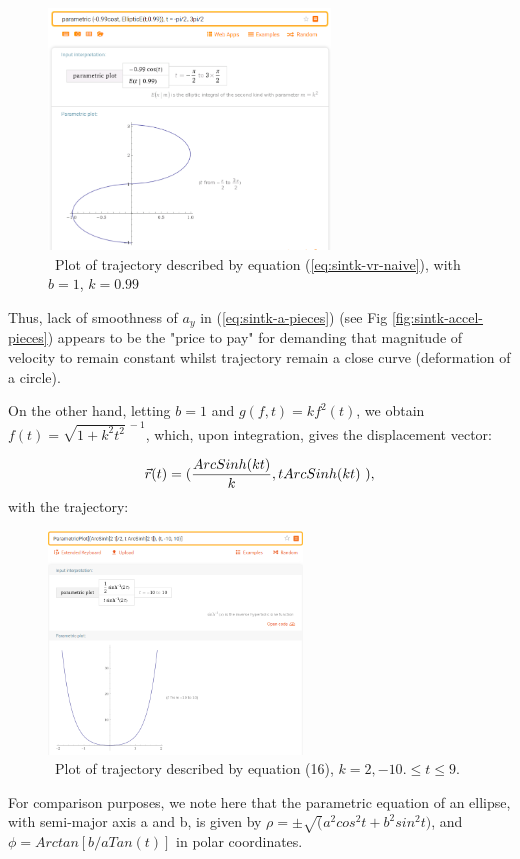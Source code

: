 \documentclass[journal]{IEEEtran}
\begin{document}
\begin{figure}[H]
\includegraphics[width=7.5cm]{traject-sintk-naive}
\caption{\ Plot of trajectory described by equation (\ref{eq:sintk-vr-naive}), with $b=1$, $k=0.99$ \bigskip}
\centering
\label{fig:traject-sintk-naive}
\end{figure}


Thus, lack of smoothness of $a_y$ in (\ref{eq:sintk-a-pieces}) (see Fig \ref{fig:sintk-accel-pieces}) appears to be the "price to pay" for demanding that magnitude of velocity to remain constant whilst trajectory remain a close curve (deformation of a circle).

On the other hand, letting $b=1$ and $g(f,t)=kf^2(t)$, we obtain $ f(t) = \sqrt{1+{k^2}{t^2}}^{\ -1}$, which, upon integration, gives the displacement vector:

\begin{align}
\vec{r}(t)=({ArcSinh(kt)\over k}, {tArcSinh(kt)} \ ),
\end{align} with the trajectory:

\begin{figure}[H]
\includegraphics[width=6.75cm]{fig11}
\caption{\ Plot of trajectory described by equation (16), $k=2, -10. \leq t \leq 9. $\bigskip}
\centering
\end{figure}

For comparison purposes, we note here that the parametric equation of an ellipse, with semi-major axis a and b, is given by 
$\rho = \pm \sqrt(a^2cos^2t+ b^2sin^2t) $, and 
$\phi = Arctan[b/aTan(t)]$ in polar coordinates.
\end{document}
